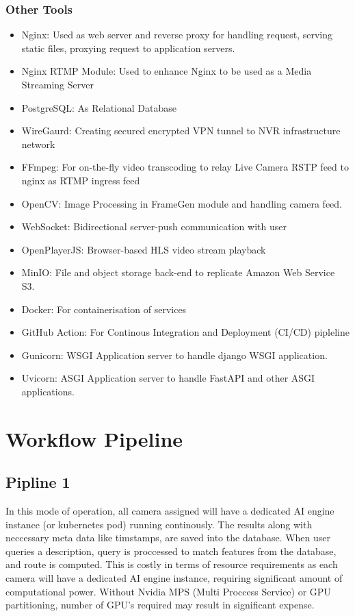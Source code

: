 \subsubsection*{Other Tools}
\begin{itemize}
	\item Nginx: Used as web server and reverse proxy for handling request, serving static files, proxying request to application servers.
	\item Nginx RTMP Module: Used to enhance Nginx to be used as a Media Streaming Server
	\item PostgreSQL: As Relational Database
	\item WireGaurd: Creating secured encrypted VPN tunnel to NVR infrastructure network
	\item FFmpeg: For on-the-fly video transcoding to relay Live Camera RSTP feed to nginx as RTMP ingress feed
	\item OpenCV: Image Processing in FrameGen module and handling camera feed.
	\item WebSocket: Bidirectional server-push communication with user
	\item OpenPlayerJS: Browser-based HLS video stream playback
	\item MinIO: File and object storage back-end to replicate Amazon Web Service S3.
	\item Docker: For containerisation of services
	\item GitHub Action: For Continous Integration and Deployment (CI/CD) pipleline
	\item Gunicorn: WSGI Application server to handle django WSGI application.
	\item Uvicorn: ASGI Application server to handle FastAPI and other ASGI applications. 
\end{itemize}


\section{Workflow Pipeline}

\subsection*{Pipline 1}
In this mode of operation, all camera assigned will have a dedicated AI engine instance (or kubernetes pod) running continously. The results along with neccessary meta data like timstamps, are saved into the database. When user queries a description, query is proccessed to match features from the database, and route is computed. 
This is costly in terms of resource requirements as each camera will have a dedicated AI engine instance, requiring significant amount of computational power. Without Nvidia MPS (Multi Proccess Service) or GPU partitioning, number of GPU's required may result in significant expense.

